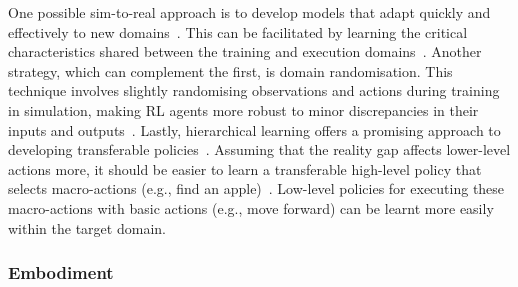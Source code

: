 One possible sim-to-real approach is to develop models that adapt quickly and effectively to new domains~\citep{Rusu2017_ProgressiveNets}. This can be facilitated by learning the critical characteristics shared between the training and execution domains~\citep{Gupta2017_InvariantFeatureSpace, James2019_Sim2Real}. Another strategy, which can complement the first, is domain randomisation. This technique involves slightly randomising observations and actions during training in simulation, making RL agents more robust to minor discrepancies in their inputs and outputs~\citep{Tobin2017_RealityGap, Chebotar2019_Sim2Real, OpenAI2020_DextHandManip}. Lastly, hierarchical learning offers a promising approach to developing transferable policies~\citep{Nachum2020_HierchicalSim2Real, DAmbrosio2024_PingPong}. Assuming that the reality gap affects lower-level actions more, it should be easier to learn a transferable high-level policy that selects macro-actions (e.g., find an apple)~\citep{Amato2019_MacroActions}. Low-level policies for executing these macro-actions with basic actions (e.g., move forward) can be learnt more easily within the target domain. 



\subsubsection{Embodiment}\label{sec:MAL:Embodiment}

